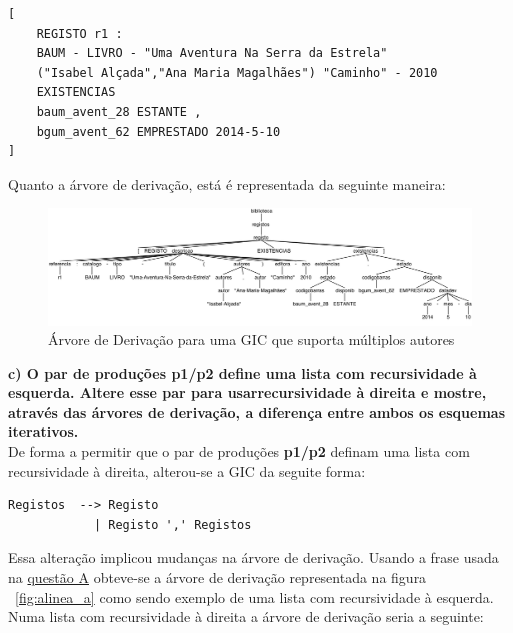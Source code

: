 \begin{verbatim}
[
	REGISTO r1 :
	BAUM - LIVRO - "Uma Aventura Na Serra da Estrela"
	("Isabel Alçada","Ana Maria Magalhães") "Caminho" - 2010
	EXISTENCIAS
	baum_avent_28 ESTANTE ,
	bgum_avent_62 EMPRESTADO 2014-5-10
]
\end{verbatim}
Quanto a árvore de derivação, está é representada da seguinte maneira:

\begin{figure}[!h]
	\centering
    \includegraphics[width=\textwidth]{./imagens/alineab.png}
    \caption{Árvore de Derivação para uma GIC que suporta múltiplos autores}
    \label{fig:alinea_b}
\end{figure}

\label{sub:alinea_c}

\textbf{c) O par de produções p1/p2 define uma lista com recursividade à esquerda. Altere esse par para usarrecursividade à direita e mostre, através das árvores de derivação, a diferença entre ambos os esquemas iterativos.}\\

De forma a permitir que o par de produções \textbf{p1/p2} definam uma lista com recursividade à direita, alterou-se a GIC da seguite forma:

\begin{verbatim}
Registos  --> Registo
            | Registo ',' Registos
\end{verbatim}

Essa alteração implicou mudanças na árvore de derivação. Usando a frase usada na  \hyperref[sub:alinea_a]{questão A} obteve-se a árvore de derivação representada na figura ~\ref{fig:alinea_a} como sendo exemplo de uma lista com recursividade à esquerda. Numa lista com recursividade à direita a árvore de derivação seria a seguinte:

